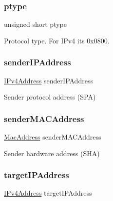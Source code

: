 \subsubsection{\texorpdfstring{ptype}{ptype}}
{\footnotesize\ttfamily unsigned short ptype}



Protocol type. For I\+Pv4 it\textquotesingle{}s 0x0800. 

\mbox{\label{struct_a_r_pmessage___a327239df3565c3a31da48f74b65e15b1}} 
\subsubsection{\texorpdfstring{senderIPAddress}{senderIPAddress}}
{\footnotesize\ttfamily \mbox{\hyperlink{group__ipv4_gac3530474aec32033cd4709abdc7bded7}{I\+Pv4\+Address}} sender\+I\+P\+Address}



Sender protocol address (S\+PA) 

\mbox{\label{struct_a_r_pmessage___a373dc2ffcc6b2a5b9a8682478906c256}} 
\subsubsection{\texorpdfstring{senderMACAddress}{senderMACAddress}}
{\footnotesize\ttfamily \mbox{\hyperlink{ethernet_types_8h_a7fed77396097fa92ca5f4b185844244c}{Mac\+Address}} sender\+M\+A\+C\+Address}



Sender hardware address (S\+HA) 

\mbox{\label{struct_a_r_pmessage___a810f2c0c6e91e68940dbf87740664f0f}} 
\subsubsection{\texorpdfstring{targetIPAddress}{targetIPAddress}}
{\footnotesize\ttfamily \mbox{\hyperlink{group__ipv4_gac3530474aec32033cd4709abdc7bded7}{I\+Pv4\+Address}} target\+I\+P\+Address}



